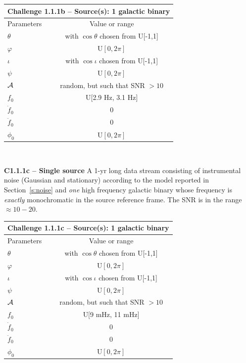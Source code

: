 \documentclass[11pt]{report}
\begin{document}
\begin{description}
\begin{center}
\begin{tabular}{l|c}
\hline \hline
\multicolumn{2}{c}{{\bf Challenge 1.1.1b -- Source(s): 1 galactic binary}} \\
\hline
Parameters & Value or range \\
\hline
$\theta$          & with $\cos\theta$ chosen from U[-1,1]\\
$\varphi$         & U$[0,2\pi]$ \\ 
$\iota$           & with $\cos\iota$ chosen from U[-1,1]\\ 
$\psi$            & U$[0,2\pi]$ \\
${\cal A}$        & random, but such that SNR $> 10$ \\
$f_0$             & U[2.9 Hz, 3.1 Hz] \\ 
$\dot{f}_0$       & 0 \\ 
$\ddot{f}_0$      & 0\\ 
$\phi_0$          & U$[0,2\pi]$ \\
\hline \hline
\end{tabular} \\
\end{center}

\item {\bf C1.1.1c -- Single source} A 1-yr long data stream consisting of instrumental noise (Gaussian and stationary) according to the model reported in Section~\ref{s:noise} and {\em one} high frequency galactic binary whose frequency is {\em exactly} monochromatic in the source reference frame. The SNR is in the range $\approx 10-20$. 

\begin{center}
\begin{tabular}{l|c}
\hline \hline
\multicolumn{2}{c}{{\bf Challenge 1.1.1c -- Source(s): 1 galactic binary}} \\
\hline
Parameters & Value or range \\
\hline
$\theta$          & with $\cos\theta$ chosen from U[-1,1]\\
$\varphi$         & U$[0,2\pi]$ \\ 
$\iota$           & with $\cos\iota$ chosen from U[-1,1]\\ 
$\psi$            & U$[0,2\pi]$ \\
${\cal A}$        & random, but such that SNR $> 10$ \\
$f_0$             & U[9 mHz, 11 mHz] \\ 
$\dot{f}_0$       & 0 \\ 
$\ddot{f}_0$      & 0\\ 
$\phi_0$          & U$[0,2\pi]$ \\
\hline \hline
\end{tabular} \\
\end{center}



\end{description}
\end{document}
